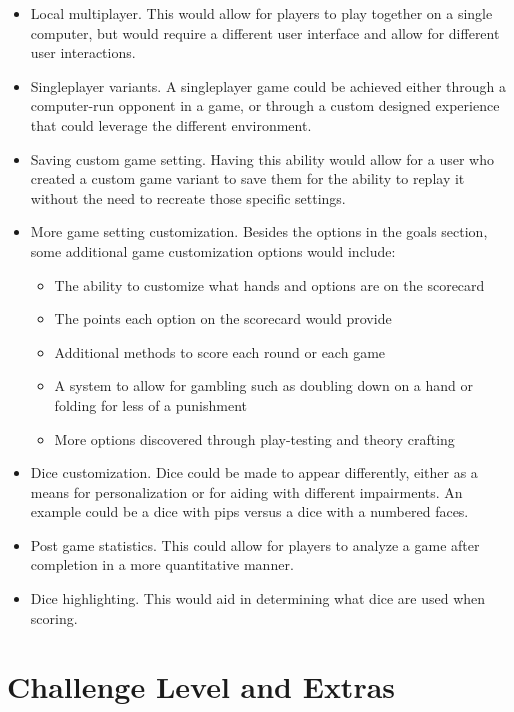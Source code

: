 \documentclass{article}
\begin{document}
\begin{itemize}
	\item Local multiplayer. This would allow for players to play together on a single computer, but would require a different user interface and allow for different user interactions.
	\item Singleplayer variants. A singleplayer game could be achieved either through a computer-run opponent in a game, or through a custom designed experience that could leverage the different environment.
	\item Saving custom game setting. Having this ability would allow for a user who created a custom game variant to save them for the ability to replay it without the need to recreate those specific settings.
	\item More game setting customization. Besides the options in the goals section, some additional game customization options would include:
	\begin{itemize}
        \item The ability to customize what hands and options are on the scorecard
        \item The points each option on the scorecard would provide
        \item Additional methods to score each round or each game
        \item A system to allow for gambling such as doubling down on a hand or folding for less of a punishment
        \item More options discovered through play-testing and theory crafting
    \end{itemize}
	\item Dice customization. Dice could be made to appear differently, either as a means for personalization or for aiding with different impairments. An example could be a dice with pips versus a dice with a numbered faces.
	\item Post game statistics. This could allow for players to analyze a game after completion in a more quantitative manner.
	\item Dice highlighting. This would aid in determining what dice are used when scoring.
\end{itemize}

\section{Challenge Level and Extras}

\iffalse
{}
\end{document}
